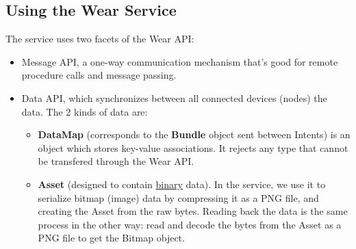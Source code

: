 \documentclass[11pt]{article}
\begin{document}
\subsection{Using the Wear Service}
The service uses two facets of the Wear API:
\begin{itemize}
    \item Message API, a one-way communication mechanism that’s good for remote procedure calls and message passing. 
    
    \item Data API, which synchronizes between all connected devices (nodes) the data. The 2 kinds of data are:
        \begin{itemize}
            \item \textbf{DataMap} (corresponds to the \textbf{Bundle} object sent between Intents) is an object which stores key-value associations. It rejects any type that cannot be transfered through the Wear API. 
            
            \item \textbf{Asset} (designed to contain \underline{binary} data). In the service, we use it to serialize bitmap (image) data by compressing it as a PNG file, and creating the Asset from the raw bytes. Reading back the data is the same process in the other way: read and decode the bytes from the Asset as a PNG file to get the Bitmap object.
        \end{itemize}
\end{itemize}
\end{document}
